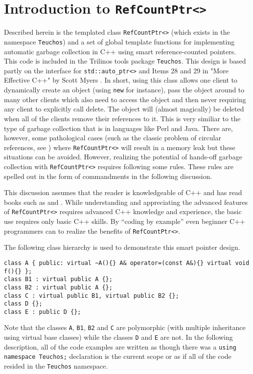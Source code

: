 %
\section{Introduction to {}\texttt{RefCountPtr<>}}
\label{rcp:sec:intro}
%

Described herein is the templated class {}\texttt{RefCountPtr<>}
(which exists in the namespace {}\texttt{Teuchos}) and a set of global
template functions for implementing automatic garbage collection in
C++ using smart reference-counted pointers.  This code is included in
the Trilinos {}\cite{ref:Trilinos-Overview} tools package
{}\texttt{Teuchos}.  This design is based partly on the interface for
{}\texttt{std::auto\_ptr<>} and Items 28 and 29 in "More Effective
C++" by Scott Myers {}\cite{ref:meyers_1996}.  In short, using this
class allows one client to dynamically create an object (using
{}\texttt{new} for instance), pass the object around to many other
clients which also need to access the object and then never requiring
any client to explicitly call delete.  The object will (almost
magically) be deleted when all of the clients remove their references
to it.  This is very similiar to the type of garbage collection that
is in languages like Perl and Java.  There are, however, some
pathological cases (such as the classic problem of circular
references, see {}\cite[Item 29, page 212]{ref:meyers_1996}) where
{}\texttt{RefCountPtr<>} will result in a memory leak but these
situations can be avoided.  However, realizing the potential of
hands-off garbage collection with {}\texttt{RefCountPtr<>} requires
following some rules.  These rules are spelled out in the form of
commandments in the following discussion.

This discussion assumes that the reader is knowledgeable of C++ and
has read books such as {}\cite{ref:stroustrup_2000} and
{}\cite{ref:meyers_1994}.  While understanding and appreciating the
advanced features of {}\texttt{RefCountPtr<>} requires advanced C++
knowledge and experience, the basic use requires only basic C++
skills.  By ``coding by example'' even beginner C++ programmers can to
realize the benefits of {}\texttt{RefCountPtr<>}.

The following class hierarchy is used to demonstrate this smart
pointer design.
%
{\scriptsize\begin{verbatim}
class A { public: virtual ~A(){} A& operator=(const A&){} virtual void f(){} };
class B1 : virtual public A {};
class B2 : virtual public A {};
class C : virtual public B1, virtual public B2 {};
class D {};
class E : public D {};
\end{verbatim}}
%
Note that the classes {}\texttt{A}, {}\texttt{B1}, {}\texttt{B2} and
{}\texttt{C} are polymorphic (with multiple inheritance using virtual
base classes) while the classes {}\texttt{D} and {}\texttt{E} are not.
In the following description, all of the code examples are written as
though there was a {}\texttt{using namespace Teuchos;} declaration is
the current scope or as if all of the code resided in the
{}\texttt{Teuchos} namespace.

